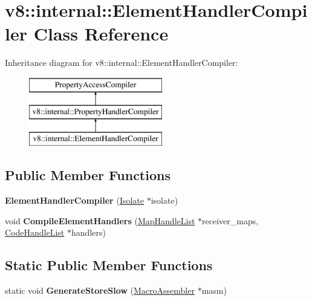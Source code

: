 \hypertarget{classv8_1_1internal_1_1_element_handler_compiler}{}\section{v8\+:\+:internal\+:\+:Element\+Handler\+Compiler Class Reference}
\label{classv8_1_1internal_1_1_element_handler_compiler}
Inheritance diagram for v8\+:\+:internal\+:\+:Element\+Handler\+Compiler\+:\begin{figure}[H]
\begin{center}
\leavevmode
\includegraphics[height=3.000000cm]{classv8_1_1internal_1_1_element_handler_compiler}
\end{center}
\end{figure}
\subsection*{Public Member Functions}
\begin{DoxyCompactItemize}
\item 
{\bfseries Element\+Handler\+Compiler} (\hyperlink{classv8_1_1internal_1_1_isolate}{Isolate} $\ast$isolate)\hypertarget{classv8_1_1internal_1_1_element_handler_compiler_a569a52f5bcd937f283efe631758dc3bf}{}\label{classv8_1_1internal_1_1_element_handler_compiler_a569a52f5bcd937f283efe631758dc3bf}

\item 
void {\bfseries Compile\+Element\+Handlers} (\hyperlink{classv8_1_1internal_1_1_list}{Map\+Handle\+List} $\ast$receiver\+\_\+maps, \hyperlink{classv8_1_1internal_1_1_list}{Code\+Handle\+List} $\ast$handlers)\hypertarget{classv8_1_1internal_1_1_element_handler_compiler_ae66502cca58d0f0f1eee553c020c9ead}{}\label{classv8_1_1internal_1_1_element_handler_compiler_ae66502cca58d0f0f1eee553c020c9ead}

\end{DoxyCompactItemize}
\subsection*{Static Public Member Functions}
\begin{DoxyCompactItemize}
\item 
static void {\bfseries Generate\+Store\+Slow} (\hyperlink{classv8_1_1internal_1_1_macro_assembler}{Macro\+Assembler} $\ast$masm)\hypertarget{classv8_1_1internal_1_1_element_handler_compiler_a457289816aaf77855df7780bdb1b0539}{}\label{classv8_1_1internal_1_1_element_handler_compiler_a457289816aaf77855df7780bdb1b0539}

\end{DoxyCompactItemize}

